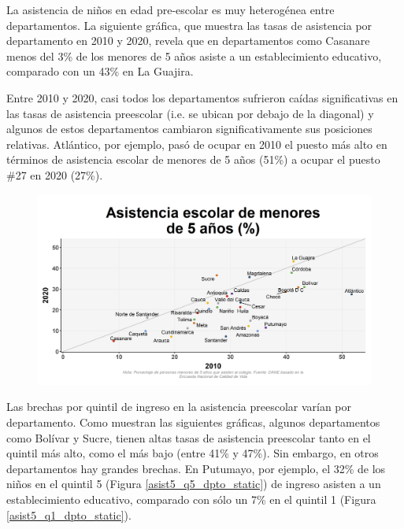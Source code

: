         La asistencia de niños en edad pre-escolar es muy heterogénea entre departamentos.  La siguiente gráfica, que muestra las tasas de asistencia por departamento en 2010 y 2020, revela que en departamentos como Casanare  menos del 3\% de los menores de 5 años asiste a un establecimiento educativo, comparado con un 43\% en La Guajira. 
        
        Entre 2010 y 2020, casi todos los departamentos sufrieron caídas significativas en las tasas de asistencia preescolar (i.e. se ubican por debajo de la diagonal) y algunos de estos departamentos cambiaron significativamente sus posiciones relativas. Atlántico, por ejemplo, pasó de ocupar en 2010 el puesto más alto en términos de asistencia escolar de menores de 5 años (51\%) a ocupar el puesto \#27 en 2020 (27\%).     

    \begin{figure}[H]
        \caption[Asistencia escolar de menores de 5 años por departamentos - 2010 VS 2020 ]{\label{asist5_dpto_scatter} }
        \begin{center}
        \includegraphics[width=\textwidth,keepaspectratio]{img/var_99_scatter_time.png}
        \end{center}
    \end{figure}

        Las brechas por quintil de ingreso en la asistencia preescolar varían por departamento. Como muestran las siguientes gráficas, algunos departamentos como Bolívar y Sucre, tienen altas tasas de asistencia preescolar tanto en el quintil más alto, como el más bajo (entre 41\% y 47\%). Sin embargo, en otros departamentos hay grandes brechas. En Putumayo, por ejemplo, el 32\% de los niños en el quintil 5 (Figura \ref{asist5_q5_dpto_static}) de ingreso asisten a un establecimiento educativo, comparado con sólo un 7\% en el quintil 1 (Figura \ref{asist5_q1_dpto_static}). 

